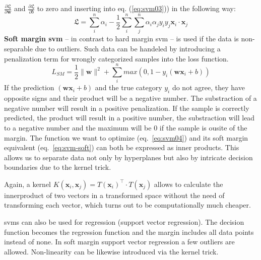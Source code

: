 $\frac{\partial \mathfrak{L}}{\partial \mathbf{w}}$ and $\frac{\partial \mathfrak{L}}{\partial b}$ 
to zero and inserting into eq. (\ref{eq:svm03}))\cite{winston1992artificial,cherkassky1998learning} in the following way: 
\begin{equation}
	\label{eq:svm04}
	\mathfrak{L} = \sum_i^n \alpha_i - \frac{1}{2} \sum_i^n \sum_j^n \alpha_i \alpha_j y_i y_j \mathbf{x}_i \cdot \mathbf{x}_j 
\end{equation}
%
\textbf{Soft margin \gls{svm}} -- in contrast to hard margin \gls{svm} -- is used if the data is non-separable due to outliers\cite{cortes1995support}.
Such data can be handeled by introducing a penalization term for wrongly categorized samples into the loss function. 
\begin{equation}
	\label{eq:svm-soft}
	L_{SM} = \frac{1}{2} \|\mathbf{w}\|^2 + \sum_i^n max \left( 0, 1- y_i ( \mathbf{w} \mathbf{x}_i + b ) \right) 
\end{equation}
If the prediction $(\mathbf{w}\mathbf{x}_i+b)$ and the true category $y_i$ do not agree, 
they have opposite signs and their product will be a negative number.
The substraction of a negative number will result in a positive penalization. 
If the sample is correctly predicted, the product will result in a positive number, 
the substraction will lead to a negative number and the maximum will be 0 if the sample is ousite of the margin. 
%
The function we want to optimize (eq.~\ref{eq:svm04}) and its soft margin equivalent (eq.~\ref{eq:svm-soft}) can both be expressed as inner products. 
This allows us to separate data not only by hyperplanes 
but also by intricate decision boundaries due to the kernel trick. 

Again, a kernel $K(\mathbf{x}_i, \mathbf{x}_j) = T(\mathbf{x}_i)^\top \cdot T(\mathbf{x}_j)$ allows to calculate the innerproduct of two vectors in a transformed space without the need of transforming each vector, which turns out to be computationally much cheaper. 

\Gls{svm}s can also be used for regression (support vector regression).
The decision function becomes the regression function and the margin includes all data points instead of none. 
In soft margin support vector regression a few
outliers are allowed.
Non-linearity can be likewise introduced via the kernel trick. 

